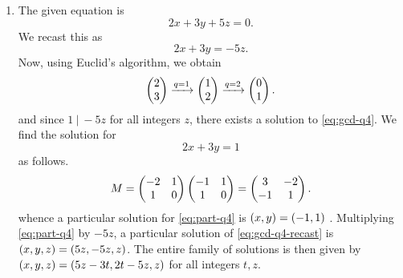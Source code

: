 \documentclass[journal,12pt,onecolumn]{IEEEtran}
\begin{document}
\begin{enumerate}
    \item The given equation is
    \begin{equation}
        2x + 3y + 5z = 0.
        \label{eq:gcd-q4}
    \end{equation}
    We recast this as
    \begin{equation}
        2x + 3y = -5z.
        \label{eq:gcd-q4-recast}
    \end{equation}
    Now, using Euclid's algorithm, we obtain
    \begin{equation}
        \begin{pmatrix}2\\3\end{pmatrix} \xrightarrow{q=1} \begin{pmatrix}1\\2\end{pmatrix} \xrightarrow{q=2} \begin{pmatrix}0\\1\end{pmatrix}.
        \label{eq:euclid-q4}
    \end{equation}
    and since \(1\ |\ -5z\) for all integers \(z\), there exists a solution to
    \eqref{eq:gcd-q4}. We find the solution for 
    \begin{equation}
        2x + 3y = 1
        \label{eq:part-q4}
    \end{equation}
    as follows.
    \begin{equation}
        M = \begin{pmatrix}-2 & 1 \\ 1 & 0\end{pmatrix}\begin{pmatrix}-1 & 1 \\ 1 & 0\end{pmatrix} = \begin{pmatrix}3 & -2 \\ -1 & 1\end{pmatrix}.
        \label{eq:mtx-q4}
    \end{equation}
    whence a particular solution for \eqref{eq:part-q4} is \(\left(x, y\right) =
    \left(-1, 1\right)\) . Multiplying \eqref{eq:part-q4} by \(-5z\), a particular
    solution of \eqref{eq:gcd-q4-recast} is \(\left(x,y,z\right) = \left(5z, -5z,
    z\right)\). The entire family of solutions is then given by \(\left(x,y,z\right) =
    \left(5z-3t,2t-5z,z\right)\) for all integers \(t,z\).
\end{enumerate}
\end{document}
